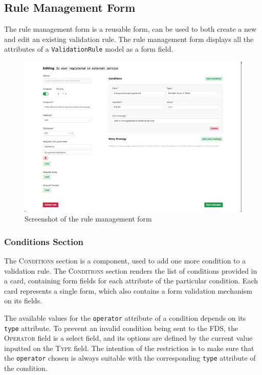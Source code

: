   \subsection{Rule Management Form}
  
    The rule management form is a reusable form, can be used to both create a new and edit an existing validation rule. The rule management form displays all the attributes of a \verb;ValidationRule; model as a form field. 

    \begin{figure}[!ht]
      \includegraphics[width=\textwidth]{images/ss_sample_filled.jpeg}
      \caption{Screenshot of the rule management form}
    \end{figure}

    \subsubsection{Conditions Section}

      The \textsc{Conditions} section is a component, used to add one more condition to a validation rule. The \textsc{Conditions} section renders the list of conditions provided in a card, containing form fields for each attribute of the particular condition. Each card represents a single form, which also contains a form validation mechanism on its fields. 
      
      The available values for the \verb;operator; attribute of a condition depends on its \verb;type; attribute. To prevent an invalid condition being sent to the FDS, the \textsc{Operator} field is a select field, and its options are defined by the current value inputted on the \textsc{Type} field. The intention of the restriction is to make sure that the \verb;operator; chosen is always suitable with the corresponding \verb;type; attribute of the condition.

